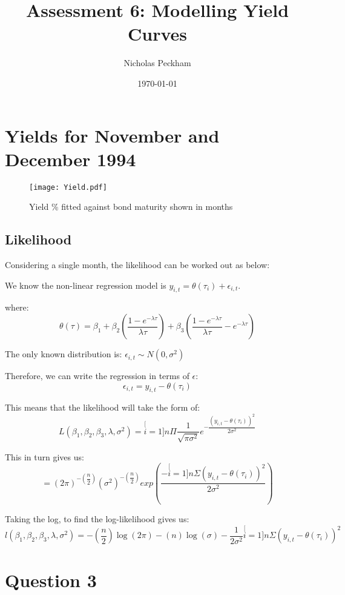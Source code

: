 \documentclass[11pt, a4paper]{article}
\author{Nicholas Peckham}
\title{Assessment 6: Modelling Yield Curves}
\date{\today}
\begin{document}
\maketitle

\section{Yields for November and December 1994} 

\begin{figure}[!h]
\centering
\texttt{[image: Yield.pdf]}
\caption{Yield \% fitted against bond maturity shown in months}
\end{figure}
 

\subsection{Likelihood}

Considering a single month, the likelihood can be worked out as below:

We know the non-linear regression model is $y_{i,t} = \theta(\tau_{i}) + \epsilon_{i,t}$.

where: \[
\theta(\tau) = \beta_{1} + \beta_{2}(\dfrac{1-e^{-\lambda\tau}}{\lambda\tau}) + \beta_{3}(\dfrac{1-e^{-\lambda\tau}}{\lambda\tau} - e^{-\lambda\tau})
\]

The only known distribution is: $\epsilon_{i,t} \sim N(0, \sigma^{2})$

Therefore, we can write the regression in terms of $\epsilon$:
\[
\epsilon_{i,t} = y_{i,t} - \theta(\tau_{i})
\]

This means that the likelihood will take the form of: 
\[
L(\beta_{1}, \beta_{2}, \beta_{3}, \lambda, \sigma^{2} ) = \stackrel[i=1]{n}{\Pi}\dfrac{1}{\sqrt{\pi\sigma^{2}}}e^{-\dfrac{(y_{i,t}-\theta(\tau_{i}))^{2}}{2\sigma^{2}}}
\]

This in turn gives us:
\[
= (2\pi)^{-(\dfrac{n}{2})} (\sigma^{2})^{-(\dfrac{n}{2})} exp(\dfrac{-\stackrel[i=1]{n}{\Sigma}(y_{i,t} - \theta(\tau_{i}))^{2}}{2\sigma^{2}})
\]


Taking the log, to find the log-likelihood gives us:
\[
l(\beta_{1}, \beta_{2}, \beta_{3}, \lambda, \sigma^{2}) = -(\dfrac{n}{2})\log(2\pi) - (n)\log(\sigma) - \dfrac{1}{2\sigma^{2}}\stackrel[i=1]{n}{\Sigma}(y_{i,t} - \theta(\tau_{i}))^{2}
\]
 
\section{Question 3}
\end{document}
